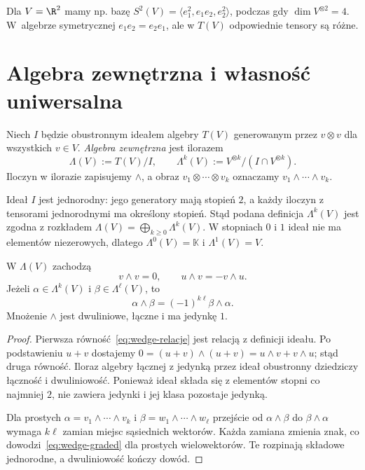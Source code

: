 Dla $V=\R^2$ mamy np. bazę
$S^2(V)=\langle e_1^2,e_1e_2,e_2^2\rangle$,
podczas gdy $\dim V^{\otimes2}=4$. W~algebrze symetrycznej
$e_1e_2=e_2e_1$, ale w $T(V)$ odpowiednie tensory są różne.

\section{Algebra zewnętrzna i własność uniwersalna}
\label{sec:algebra-zewnetrzna}

\begin{definicja}
\label{def:algebra-zewnetrzna}
Niech $I$ będzie obustronnym ideałem algebry $T(V)$
generowanym przez $v\otimes v$ dla wszystkich $v\in V$.
\emph{Algebra zewnętrzna} jest ilorazem
\[
 \Lambda(V):=T(V)/I,
 \qquad \Lambda^k(V):=V^{\otimes k}/(I\cap V^{\otimes k}).
\]
Iloczyn w ilorazie zapisujemy $\wedge$, a obraz
$v_1\otimes\cdots\otimes v_k$ oznaczamy
$v_1\wedge\cdots\wedge v_k$.
\end{definicja}

Ideał $I$ jest jednorodny: jego generatory mają stopień $2$,
a każdy iloczyn z tensorami jednorodnymi ma określony stopień.
Stąd podana definicja $\Lambda^k(V)$ jest zgodna z rozkładem
$\Lambda(V)=\bigoplus_{k\geq0}\Lambda^k(V)$.
W stopniach $0$ i $1$ ideał nie ma elementów niezerowych, dlatego
$\Lambda^0(V)=\mathbb K$ i $\Lambda^1(V)=V$.

\begin{stwierdzenie}
\label{prop:wedge-znak}
W $\Lambda(V)$ zachodzą
\begin{equation}\label{eq:wedge-relacje}
 v\wedge v=0,\qquad u\wedge v=-v\wedge u.
\end{equation}
Jeżeli $\alpha\in\Lambda^k(V)$ i $\beta\in\Lambda^\ell(V)$,
to
\begin{equation}\label{eq:wedge-graded}
 \alpha\wedge\beta=(-1)^{k\ell}\beta\wedge\alpha.
\end{equation}
Mnożenie $\wedge$ jest dwuliniowe, łączne i ma jedynkę $1$.
\end{stwierdzenie}
\begin{proof}
Pierwsza równość~\eqref{eq:wedge-relacje} jest relacją
z definicji ideału. Po podstawieniu $u+v$ dostajemy
$0=(u+v)\wedge(u+v)=u\wedge v+v\wedge u$;
stąd druga równość. Iloraz algebry łącznej z jedynką przez
ideał obustronny dziedziczy łączność i dwuliniowość.
Ponieważ ideał składa się z elementów stopni co najmniej $2$,
nie zawiera jedynki i jej klasa pozostaje jedynką.

Dla prostych $\alpha=v_1\wedge\cdots\wedge v_k$ i
$\beta=w_1\wedge\cdots\wedge w_\ell$ przejście od
$\alpha\wedge\beta$ do $\beta\wedge\alpha$ wymaga
$k\ell$ zamian miejsc sąsiednich wektorów. Każda zamiana
zmienia znak, co dowodzi~\eqref{eq:wedge-graded} dla
prostych wielowektorów. Te rozpinają składowe jednorodne,
a dwuliniowość kończy dowód.
\end{proof}

